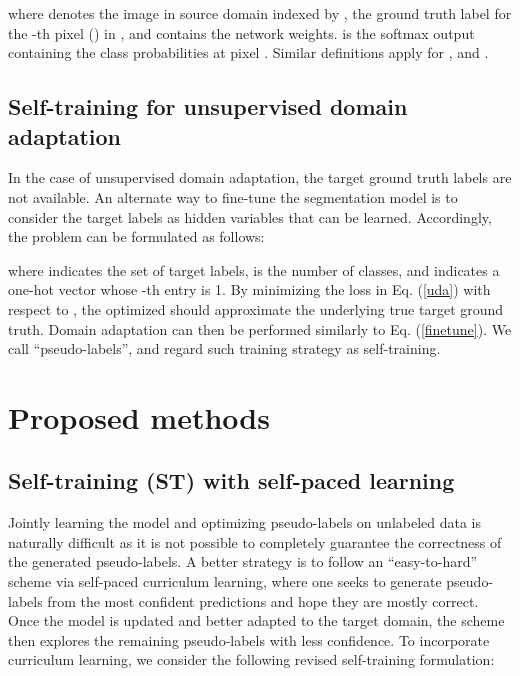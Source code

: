 \documentclass[runningheads]{llncs}
\begin{document}
where  denotes the image in source domain indexed by ,  the ground truth label for the -th pixel () in , and  contains the network weights.  is the softmax output containing the class probabilities at pixel . Similar definitions apply for ,  and .

\subsection{Self-training for unsupervised domain adaptation}
In the case of unsupervised domain adaptation, the target ground truth labels are not available. An alternate way to fine-tune the segmentation model is to consider the target labels as hidden variables that can be learned. Accordingly, the problem can be formulated as follows:

where  indicates the set of target labels,  is the number of classes, and  indicates a one-hot vector whose -th entry is 1. By minimizing the loss in Eq. (\ref{uda}) with respect to , the optimized  should approximate the underlying true target ground truth. Domain adaptation can then be performed similarly to Eq. (\ref{finetune}). We call  ``pseudo-labels'', and regard such training strategy as self-training.



\section{Proposed methods}\label{sect_st}
\subsection{Self-training (ST) with self-paced learning}
Jointly learning the model and optimizing pseudo-labels on unlabeled data is naturally difficult as it is not possible to completely guarantee the correctness of the generated pseudo-labels. A better strategy is to follow an ``easy-to-hard'' scheme via self-paced curriculum learning, where one seeks to generate pseudo-labels from the most confident predictions and hope they are mostly correct. Once the model is updated and better adapted to the target domain, the scheme then explores the remaining pseudo-labels with less confidence. To incorporate curriculum learning, we consider the following revised self-training formulation:
\end{document}
